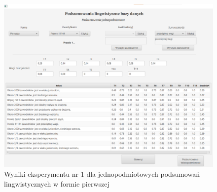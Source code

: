 \documentclass{classrep}
\begin{document}
\begin{figure}[H]
    \centering
    \includegraphics[width = 14cm]{eksperyment1.png}
    \caption{Wyniki eksperymentu nr 1 dla jednopodmiotowych podsumowań lingwistycznych w formie pierwszej}
    \label{rysunek:forma_pierwsza_eksperyment_1}
\end{figure}
\end{document}
